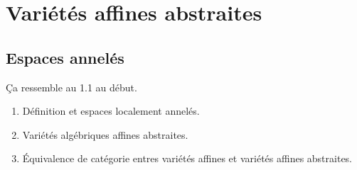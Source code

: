 \documentclass[a4paper,12pt]{book}
\theoremstyle{plain}
\theoremstyle{definition}
\theoremstyle{remark}
\begin{document}
\section{Variétés affines abstraites}
\subsection{Espaces annelés}
Ça ressemble au 1.1 au début.
\begin{enumerate}
    \item Définition et espaces localement annelés.
    \item Variétés algébriques affines abstraites.
    \item Équivalence de catégorie entres variétés affines et variétés
	affines abstraites.
\end{enumerate}



\printbibliography
\end{document}
